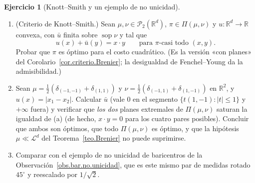 \documentclass[12pt, a4paper]{amsbook}
\def\sop{\operatorname {\mathrm{sop}}}
\newcommand{\R}{{\mathbb R}}
\newcommand{\LL}{{\mathcal L}}
\theoremstyle{remark}
\theoremstyle{definition}
\newtheorem{ejercicio}{Ejercicio}[chapter]
\numberwithin{section}{chapter}
\numberwithin{subsection}{section}
\numberwithin{equation}{section}
\numberwithin{figure}{chapter}
\begin{document}
\begin{ejercicio}[Knott--Smith y un ejemplo de no unicidad]\label{ejer.Brenier.KnottSmith}
\leavevmode
\begin{enumerate}[label=(\alph*)]
\item (Criterio de Knott--Smith.) Sean $\mu,\nu\in\mathcal P_2(\R^d)$,
$\pi\in\Pi(\mu,\nu)$ y $u\colon\R^d\to\R$ convexa, con $\bar u$ finita
sobre $\sop\nu$ y tal que
\[
u(x)+\bar u(y)=x\cdot y\qquad\text{para $\pi$-casi todo }(x,y).
\]
Probar que $\pi$ es óptimo para el costo
cuadrático. (Es la versión «con planes» del
Corolario~\ref{cor.criterio.Brenier}; la desigualdad de Fenchel--Young da
la admisibilidad.)
\item Sean $\mu=\frac12(\delta_{(-1,-1)}+\delta_{(1,1)})$ y
$\nu=\frac12(\delta_{(-1,1)}+\delta_{(1,-1)})$ en $\R^2$, y
$u(x)=|x_1-x_2|$. Calcular $\bar u$ (vale $0$ en el segmento
$\{t(1,-1):|t|\le1\}$ y $+\infty$ fuera) y verificar que \emph{los dos}
planes extremales de $\Pi(\mu,\nu)$ saturan la igualdad de (a) (de hecho,
$x\cdot y=0$ para los cuatro pares posibles). Concluir que ambos son
óptimos, que todo $\Pi(\mu,\nu)$ es óptimo, y que la hipótesis
$\mu\ll\LL^d$ del Teorema~\ref{teo.Brenier} no puede suprimirse.
\item Comparar con el ejemplo de no unicidad de baricentros de la
Observación~\ref{obs.bar.no.unicidad}, que es este mismo par de medidas
rotado $45^\circ$ y reescalado por $1/\sqrt2$.
\end{enumerate}
\end{ejercicio}
\end{document}
